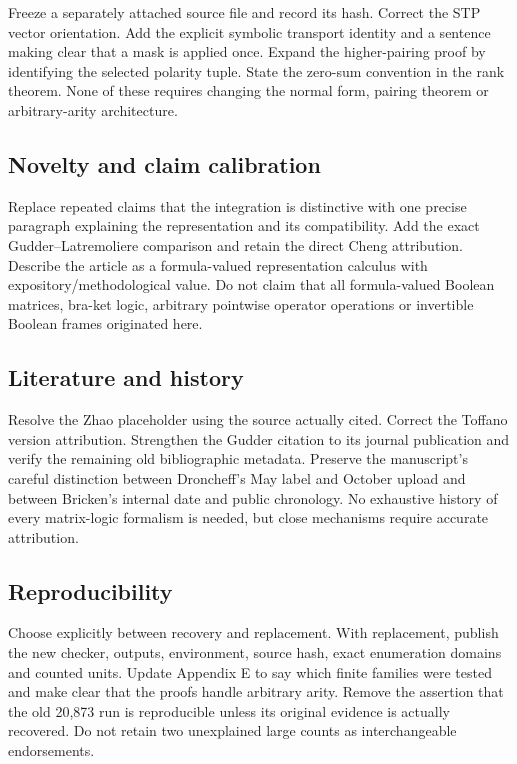 \documentclass[
  10pt,
]{article}
\begin{document}
Freeze a separately attached source file and record its hash. Correct
the STP vector orientation. Add the explicit symbolic transport identity
and a sentence making clear that a mask is applied once. Expand the
higher-pairing proof by identifying the selected polarity tuple. State
the zero-sum convention in the rank theorem. None of these requires
changing the normal form, pairing theorem or arbitrary-arity
architecture.

\subsection{Novelty and claim
calibration}\label{novelty-and-claim-calibration}

Replace repeated claims that the integration is distinctive with one
precise paragraph explaining the representation and its compatibility.
Add the exact Gudder--Latremoliere comparison and retain the direct
Cheng attribution. Describe the article as a formula-valued
representation calculus with expository/methodological value. Do not
claim that all formula-valued Boolean matrices, bra-ket logic, arbitrary
pointwise operator operations or invertible Boolean frames originated
here.

\subsection{Literature and history}\label{literature-and-history}

Resolve the Zhao placeholder using the source actually cited. Correct
the Toffano version attribution. Strengthen the Gudder citation to its
journal publication and verify the remaining old bibliographic metadata.
Preserve the manuscript's careful distinction between Droncheff's May
label and October upload and between Bricken's internal date and public
chronology. No exhaustive history of every matrix-logic formalism is
needed, but close mechanisms require accurate attribution.

\subsection{Reproducibility}\label{reproducibility}

Choose explicitly between recovery and replacement. With replacement,
publish the new checker, outputs, environment, source hash, exact
enumeration domains and counted units. Update Appendix E to say which
finite families were tested and make clear that the proofs handle
arbitrary arity. Remove the assertion that the old 20,873 run is
reproducible unless its original evidence is actually recovered. Do not
retain two unexplained large counts as interchangeable endorsements.
\end{document}
